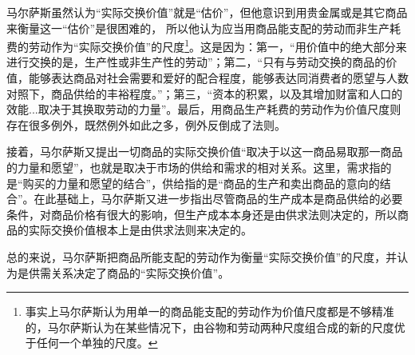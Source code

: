马尔萨斯虽然认为“实际交换价值”就是“估价”，但他意识到用贵金属或是其它商品来衡量这一“估价”是很困难的\cite[98]{BiLuo*SiLaFaDaWeiLiJiaTuQuanJiDi2JuanMaErSaSiZhengZhiJingJiXueYuanLiPingZhu2013}，
所以他认为应当用商品能支配的劳动而非生产耗费的劳动作为“实际交换价值”的尺度\footnote{事实上马尔萨斯认为用单一的商品能支配的劳动作为价值尺度都是不够精准的，马尔萨斯认为在某些情况下，由谷物和劳动两种尺度组合成的新的尺度优于任何一个单独的尺度\cite[98-105]{BiLuo*SiLaFaDaWeiLiJiaTuQuanJiDi2JuanMaErSaSiZhengZhiJingJiXueYuanLiPingZhu2013}。}\cite[60-82, 92-97]{BiLuo*SiLaFaDaWeiLiJiaTuQuanJiDi2JuanMaErSaSiZhengZhiJingJiXueYuanLiPingZhu2013}\cite[133]{MaErSaSiZhengZhiJingJiXueDingYi2023}。这是因为：第一，“用价值中的绝大部分来进行交换的是，生产性或非生产性的劳动”\cite[92]{BiLuo*SiLaFaDaWeiLiJiaTuQuanJiDi2JuanMaErSaSiZhengZhiJingJiXueYuanLiPingZhu2013}；第二，“只有与劳动交换的商品的价值，能够表达商品对社会需要和爱好的配合程度，能够表达同消费者的愿望与人数对照下，商品供给的丰裕程度。”\cite[92]{BiLuo*SiLaFaDaWeiLiJiaTuQuanJiDi2JuanMaErSaSiZhengZhiJingJiXueYuanLiPingZhu2013}；第三，“资本的积累，以及其增加财富和人口的效能...取决于其换取劳动的力量”\cite[93]{BiLuo*SiLaFaDaWeiLiJiaTuQuanJiDi2JuanMaErSaSiZhengZhiJingJiXueYuanLiPingZhu2013}。最后，用商品生产耗费的劳动作为价值尺度则存在很多例外\cite[60-82]{BiLuo*SiLaFaDaWeiLiJiaTuQuanJiDi2JuanMaErSaSiZhengZhiJingJiXueYuanLiPingZhu2013}，既然例外如此之多，例外反倒成了法则\cite[171]{CaiJiMingCongGuDianZhengZhiJingJiXueDaoZhongGuoTeSeSheHuiZhuYiZhengZhiJingJiXueJiYuZhongGuoShiJiaoDeZhengZhiJingJiXueYanBianShangCe2023}。

接着，马尔萨斯又提出一切商品的实际交换价值“取决于以这一商品易取那一商品的力量和愿望”\cite[43]{BiLuo*SiLaFaDaWeiLiJiaTuQuanJiDi2JuanMaErSaSiZhengZhiJingJiXueYuanLiPingZhu2013}，也就是取决于市场的供给和需求的相对关系。这里，需求指的是“购买的力量和愿望的结合”\cite[43]{BiLuo*SiLaFaDaWeiLiJiaTuQuanJiDi2JuanMaErSaSiZhengZhiJingJiXueYuanLiPingZhu2013}，供给指的是“商品的生产和卖出商品的意向的结合”\cite[43]{BiLuo*SiLaFaDaWeiLiJiaTuQuanJiDi2JuanMaErSaSiZhengZhiJingJiXueYuanLiPingZhu2013}。在此基础上，马尔萨斯又进一步指出尽管商品的生产成本是商品供给的必要条件，对商品价格有很大的影响\cite[50，55]{BiLuo*SiLaFaDaWeiLiJiaTuQuanJiDi2JuanMaErSaSiZhengZhiJingJiXueYuanLiPingZhu2013}，但生产成本本身还是由供求法则决定的，所以商品的实际交换价值根本上是由供求法则来决定的\cite[59]{BiLuo*SiLaFaDaWeiLiJiaTuQuanJiDi2JuanMaErSaSiZhengZhiJingJiXueYuanLiPingZhu2013}。

总的来说，马尔萨斯把商品所能支配的劳动作为衡量“实际交换价值”的尺度，并认为是供需关系决定了商品的“实际交换价值”。

